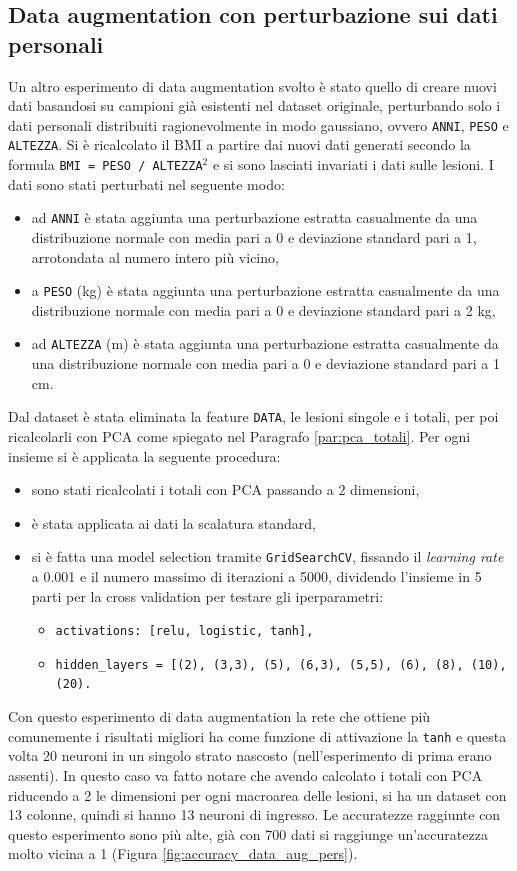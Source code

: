\documentclass[12pt, twoside, letterpaper]{report}
\begin{document}
		\subsection{Data augmentation con perturbazione sui dati personali} \label{sec:data_aug_pers}
			Un altro esperimento di data augmentation svolto è stato quello di creare nuovi dati basandosi su campioni già esistenti nel dataset originale, perturbando solo i dati personali distribuiti ragionevolmente in modo gaussiano, ovvero \texttt{ANNI}, \texttt{PESO} e \texttt{ALTEZZA}. Si è ricalcolato il BMI a partire dai nuovi dati generati secondo la formula \texttt{BMI = PESO / ALTEZZA$^2$} e si sono lasciati invariati i dati sulle lesioni. I dati sono stati perturbati nel seguente modo: 
			\begin{itemize}
			\item ad \texttt{ANNI} è stata aggiunta una perturbazione estratta casualmente da una distribuzione normale con media pari a 0 e deviazione standard pari a 1, arrotondata al numero intero più vicino,
			\item a \texttt{PESO} (kg) è stata aggiunta una perturbazione estratta casualmente da una distribuzione normale con media pari a 0 e deviazione standard pari a 2 kg,
			\item ad \texttt{ALTEZZA} (m) è stata aggiunta una perturbazione estratta casualmente da una distribuzione normale con media pari a 0 e deviazione standard pari a 1 cm.
			\end{itemize}
			Dal dataset è stata eliminata la feature \texttt{DATA}, le lesioni singole e i totali, per poi ricalcolarli con PCA come spiegato nel Paragrafo \ref{par:pca_totali}. Per ogni insieme si è applicata la seguente procedura:
				\begin{itemize}
				\item sono stati ricalcolati i totali con PCA passando a 2 dimensioni,
				\item è stata applicata ai dati la scalatura standard,
				\item si è fatta una model selection tramite \texttt{GridSearchCV}, fissando il \textit{learning rate} a 0.001 e il numero massimo di iterazioni a 5000, dividendo l'insieme in 5 parti per la cross validation per testare gli iperparametri:
				 	\begin{itemize}
					\item \texttt{activations: [relu, logistic, tanh],}
    				\item \texttt{hidden\_layers = [(2), (3,3), (5), (6,3), (5,5), (6), (8), (10), (20).}
					\end{itemize}
				 \end{itemize}
			Con questo esperimento di data augmentation la rete che ottiene più comunemente i risultati migliori ha come funzione di attivazione la \texttt{tanh} e questa volta 20 neuroni in un singolo strato nascosto (nell'esperimento di prima erano assenti). In questo caso va fatto notare che avendo calcolato i totali con PCA riducendo a 2 le dimensioni per ogni macroarea delle lesioni, si ha un dataset con 13 colonne, quindi si hanno 13 neuroni di ingresso. Le accuratezze raggiunte con questo esperimento sono più alte, già con 700 dati si raggiunge un'accuratezza molto vicina a 1 (Figura \ref{fig:accuracy_data_aug_pers}).
			
\end{document}
